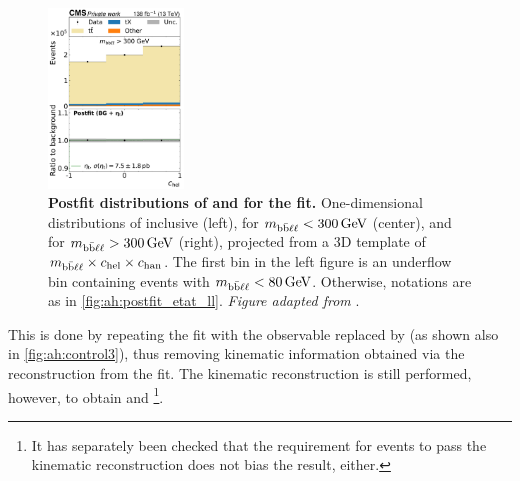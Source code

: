\begin{figure}[p]
    \hfill
    \includegraphics[width=0.32\textwidth]{figures/ah/prepost/EtaT_mbbllspin_fit_s_ll_run2_both_chel_mbbllgt300.pdf}
    \caption{
        \label{fig:ah:postfit_mbbll}
        \textbf{Postfit distributions of \mbbll and \chel for the \etat fit.} One-dimensional distributions of inclusive \mbbll (left), \chel for $\mbbll < \SI{300}{\GeV}$ (center), and \chel for $\mbbll > \SI{300}{\GeV}$ (right), projected from a 3D template of $m_{\mathrm{b\bar{b}\ell\ell}} \times c_{\mathrm{hel}} \times c_{\mathrm{han}}$. The first \mbbll bin in the left figure is an underflow bin containing events with $\mbbll < \SI{80}{\GeV}$. Otherwise, notations are as in \cref{fig:ah:postfit_etat_ll}. \textit{Figure adapted from }.
    }  
\end{figure}


This is done by repeating the fit with the observable \mtt replaced by \mbbll (as shown also in \cref{fig:ah:control3}), thus removing kinematic information obtained via the reconstruction from the fit. The kinematic reconstruction is still performed, however, to obtain \chel and \chan\footnote{It has separately been checked that the requirement for events to pass the kinematic reconstruction does not bias the result, either.}. %

